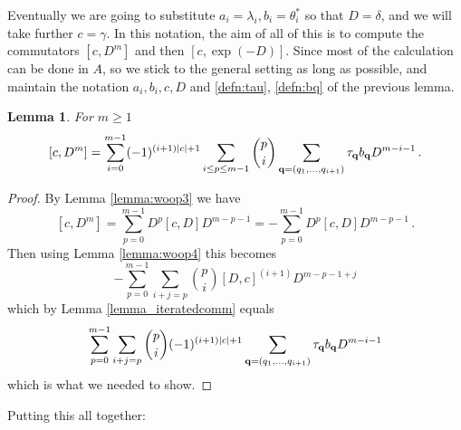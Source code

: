 \documentclass[english,letter paper,12pt,leqno]{article}
\newtheorem{lemma}[theorem]{Lemma}
\theoremstyle{example}
\numberwithin{equation}{section}
\def\be{\begin{equation}}
\def\ee{\end{equation}}
\begin{document}
Eventually we are going to substitute $a_i = \lambda_i, b_i = \theta_i^*$ so that $D = \delta$, and we will take further $c = \gamma$. In this notation, the aim of all of this is to compute the commutators $[c, D^m]$ and then $[c, \exp(-D)]$. Since most of the calculation can be done in $A$, so we stick to the general setting as long as possible, and maintain the notation $a_i, b_i, c, D$ and \eqref{defn:tau}, \eqref{defn:bq} of the previous lemma.


\begin{lemma}\label{lemma:commutator_wha} For $m \ge 1$
\[
[ c, D^m ] = \sum_{i=0}^{m-1} (-1)^{(i+1)|c| + 1} \sum_{i \le p \le m -1} \binom{p}{i} \sum_{\bold{q} = (q_1,\ldots,q_{i+1})} \tau_{\bold{q}} b_{\bold{q}} D^{m-i-1}\,.
\]
\end{lemma}
\begin{proof} 
By Lemma \ref{lemma:woop3} we have
\begin{equation}\label{eq:catfish}
[ c, D^m ] = \sum_{p=0}^{m-1} D^p [ c, D ] D^{m-p-1} = -\sum_{p=0}^{m-1} D^p [ c, D ] D^{m-p-1}\,.
\end{equation}
Then using Lemma \ref{lemma:woop4} this becomes
\be
-\sum_{p=0}^{m-1} \sum_{i+j=p} \binom{p}{i} [D, c]^{(i+1)} D^{m-p-1+j}
\ee
which by Lemma \ref{lemma_iteratedcomm} equals
\be
\sum_{p=0}^{m-1} \sum_{i+j=p} \binom{p}{i} (-1)^{(i+1)|c| + 1} \sum_{\bold{q} = (q_1,\ldots,q_{i+1})} \tau_{\bold{q}} b_{\bold{q}} D^{m-i-1}
\ee
which is what we needed to show.
\end{proof}

Putting this all together:
\end{document}
